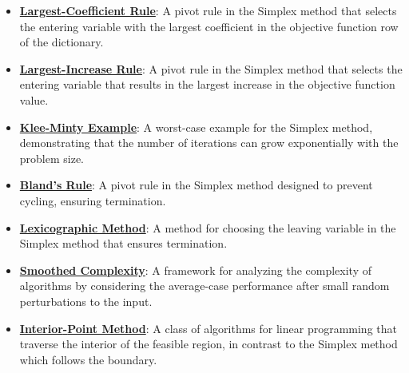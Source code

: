 \documentclass{article}%
\begin{document}
\begin{itemize}[leftmargin=*]%
\item \href{https://www.math.purdue.edu/~yipn/421//2024-09-05-SimplexEfficiency.pdf#page=4}{\textbf{Largest{-}Coefficient Rule}}: A pivot rule in the Simplex method that selects the entering variable with the largest coefficient in the objective function row of the dictionary.%
\item \href{https://www.math.purdue.edu/~yipn/421//2024-09-05-SimplexEfficiency.pdf#page=6}{\textbf{Largest{-}Increase Rule}}: A pivot rule in the Simplex method that selects the entering variable that results in the largest increase in the objective function value.%
\item \href{https://www.math.purdue.edu/~yipn/421//2024-09-05-SimplexEfficiency.pdf#page=2}{\textbf{Klee{-}Minty Example}}: A worst-case example for the Simplex method, demonstrating that the number of iterations can grow exponentially with the problem size.%
\item \href{https://www.math.purdue.edu/~yipn/421//2024-09-05-SimplexEfficiency.pdf#page=10}{\textbf{Bland's Rule}}: A pivot rule in the Simplex method designed to prevent cycling, ensuring termination.%
\item \href{https://www.math.purdue.edu/~yipn/421//2024-09-05-SimplexEfficiency.pdf#page=10}{\textbf{Lexicographic Method}}: A method for choosing the leaving variable in the Simplex method that ensures termination.%
\item \href{https://www.math.purdue.edu/~yipn/421//2024-09-05-SimplexEfficiency.pdf#page=11}{\textbf{Smoothed Complexity}}: A framework for analyzing the complexity of algorithms by considering the average-case performance after small random perturbations to the input.%
\item \href{https://www.math.purdue.edu/~yipn/421//2024-09-05-SimplexEfficiency.pdf#page=12}{\textbf{Interior{-}Point Method}}: A class of algorithms for linear programming that traverse the interior of the feasible region, in contrast to the Simplex method which follows the boundary.%
\end{itemize}%
\end{document}
